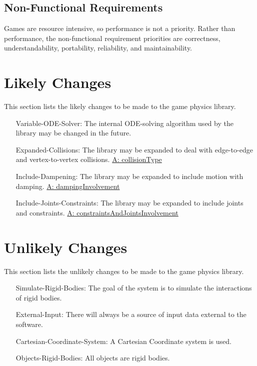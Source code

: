 \documentclass[12pt]{article}
\begin{document}
\subsection{Non-Functional Requirements}
\label{Sec:NFRs}
Games are resource intensive, so performance is not a priority.  Rather than performance, the non-functional requirement priorities are correctness, understandability, portability, reliability, and maintainability.
\section{Likely Changes}
\label{Sec:LCs}
This section lists the likely changes to be made to the game physics library.
\begin{itemize}
\item[Variable-ODE-Solver:\phantomsection\label{lcVODES}]The internal ODE-solving algorithm used by the library may be changed in the future.
\item[Expanded-Collisions:\phantomsection\label{lcEC}]The library may be expanded to deal with edge-to-edge and vertex-to-vertex collisions. \hyperref[A:collisionType]{A: collisionType}
\item[Include-Dampening:\phantomsection\label{lcID}]The library may be expanded to include motion with damping. \hyperref[A:dampingInvolvement]{A: dampingInvolvement}
\item[Include-Joints-Constraints:\phantomsection\label{lcIJC}]The library may be expanded to include joints and constraints. \hyperref[A:constraintsAndJointsInvolvement]{A: constraintsAndJointsInvolvement}
\end{itemize}
\section{Unlikely Changes}
\label{Sec:UCs}
This section lists the unlikely changes to be made to the game physics library.
\begin{itemize}
\item[Simulate-Rigid-Bodies:\phantomsection\label{ucSRB}]The goal of the system is to simulate the interactions of rigid bodies.
\item[External-Input:\phantomsection\label{ucEI}]There will always be a source of input data external to the software.
\item[Cartesian-Coordinate-System:\phantomsection\label{ucCCS}]A Cartesian Coordinate system is used.
\item[Objects-Rigid-Bodies:\phantomsection\label{ucORB}]All objects are rigid bodies.
\end{itemize}
\end{document}
